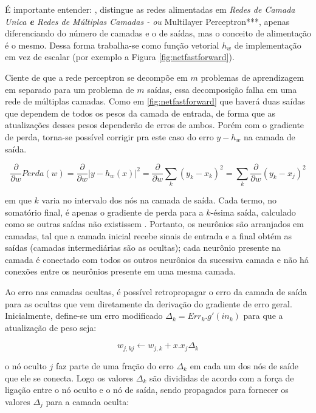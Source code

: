 \documentclass[
  openany]{book}
\begin{document}
É importante entender: \citet{haykin2007redes}, distingue as redes alimentadas em \emph{Redes de Camada Unica\textbf{ e }Redes de Múltiplas Camadas - ou }Multilayer Perceptron***, apenas diferenciando do número de camadas e o de saídas, mas o conceito de alimentação é o mesmo. Dessa forma trabalha-se como função vetorial \(h_w\) de implementação em vez de escalar (por exemplo a Figura \ref{fig:netfastforward}).

Ciente de que a rede perceptron se decompõe em \(m\) problemas de aprendizagem em separado para um problema de \(m\) saídas, essa decomposição falha em uma rede de múltiplas camadas. Como em \ref{fig:netfastforward} que haverá duas saídas que dependem de todos os pesos da camada de entrada, de forma que as atualizações
desses pesos dependerão de erros de ambos. Porém com o gradiente de perda, torna-se possível corrigir pra este caso do erro \(y-h_w\) na camada de saída.

\begin{equation} 
  \frac{\partial}{\partial w} Perda(w)=\frac{\partial}{\partial w}|y-h_w(x)|^2 = \frac{\partial}{\partial w} \displaystyle \sum_k (y_k-x_k)^2=\displaystyle \sum_k \frac{\partial}{\partial w}(y_k-x_j)^2
  \label{eq:gradienteredes}
\end{equation}

em que \(k\) varia no intervalo dos nós na camada de saída. Cada termo, no somatório final, é apenas o gradiente de perda para a \(k\)-ésima saída, calculado como se outras saídas não existissem \citep{russel2004inteligencia}. Portanto, os neurônios são arranjados em camadas, tal que a camada inicial recebe sinais de entrada e a final obtém as saídas (camadas intermediárias são as ocultas); cada neurônio presente na camada é conectado com todos os outros neurônios da sucessiva camada e não há conexões entre os neurônios presente em uma mesma camada.

Ao erro nas camadas ocultas, é possível retropropagar o erro da camada de saída para as ocultas que vem diretamente da derivação do gradiente de erro geral. Inicialmente, define-se um erro modificado \(\Delta_k=Err_k.g'(in_k)\) para que a atualização de peso seja:

\begin{equation} 
  w_{j,kj}\leftarrow w_{j,k}+x.x_j \Delta_k
  \label{eq:pesoatualizaCAO}
\end{equation}

o nó oculto \(j\) faz parte de uma fração do erro \(\Delta_k\) em cada um dos nós de saíde que ele se conecta. Logo os valores \(\Delta_k\) são divididas de acordo com a força de ligação entre o nó oculto e o nó de saída, sendo propagados para fornecer os valores \(\Delta_j\) para a camada oculta:
\end{document}
